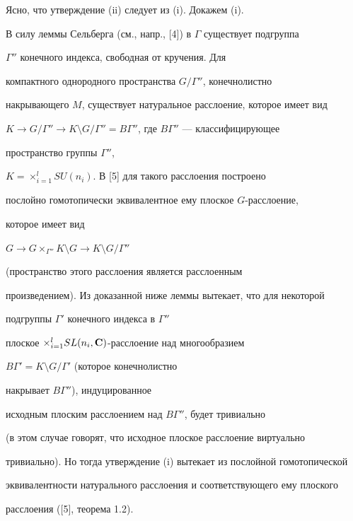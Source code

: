 \begin{pf}


Ясно, что утверждение (ii)  следует из (i). Докажем (i).





В силу леммы Сельберга (см., напр., [4]) в $\Gamma$ существует подгруппа


$\Gamma''$ конечного индекса, свободная от кручения. Для


компактного однородного пространства $G/\Gamma''$, конечнолистно


накрывающего $M$, существует натуральное расслоение, которое имеет вид


$K \to G/ \Gamma'' \to K \setminus G /\Gamma''


= B \Gamma''$, где $B\Gamma''$ --- классифицирующее


пространство группы $\Gamma''$,


$K=\times _{i=1}^l SU(n_i)$. В [5] для такого расслоения построено


послойно гомотопически эквивалентное ему плоское $G$-расслоение,


которое имеет вид


$G\to G \times_{\Gamma''} K\setminus G\to K\setminus G/\Gamma''$


(пространство этого расслоения является расслоенным


произведением). Из доказанной ниже леммы вытекает, что для некоторой


подгруппы $\Gamma'$ конечного индекса в $\Gamma''$


плоское $\times_{i=1}^l SL(n_i, \bold C)$-расслоение над многообразием


$B\Gamma' = K\setminus G /\Gamma'$ (которое конечнолистно


накрывает $B\Gamma''$), индуцированное


исходным плоским расслоением над $B\Gamma''$, будет тривиально


(в этом случае говорят, что исходное плоское расслоение виртуально


тривиально). Но тогда утверждение (i) вытекает из послойной гомотопической


эквивалентности натурального расслоения и соответствующего ему плоского


расслоения ([5], теорема 1.2).


\end{pf}






